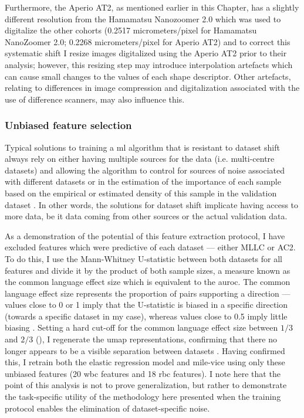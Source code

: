 Furthermore, the Aperio AT2, as mentioned earlier in this Chapter, has a slightly different resolution from the Hamamatsu Nanozoomer 2.0 which was used to digitalize the other cohorts (0.2517 micrometers/pixel for Hamamatsu NanoZoomer 2.0; 0.2268 micrometers/pixel for Aperio AT2) and to correct this systematic shift I resize images digitalized using the Aperio AT2 prior to their analysis; however, this resizing step may introduce interpolation artefacts which can cause small changes to the values of each shape descriptor. Other artefacts, relating to differences in image compression and digitalization associated with the use of difference scanners, may also influence this.

\subsubsection{Unbiased feature selection} 

Typical solutions to training a \ac{ml} algorithm that is resistant to dataset shift always rely on either having multiple sources for the data (i.e. multi-centre datasets) and allowing the algorithm to control for sources of noise associated with different datasets or in the estimation of the importance of each sample based on the empirical or estimated density of this sample in the validation dataset \cite{Y2019-vc}. In other words, the solutions for dataset shift implicate having access to more data, be it data coming from other sources or the actual validation data.

As a demonstration of the potential of this feature extraction protocol, I have excluded features which were predictive of each dataset --- either MLLC or AC2. To do this, I use the Mann-Whitney U-statistic between both datasets for all features and divide it by the product of both sample sizes, a measure known as the common language effect size which is equivalent to the \ac{auroc}. The common language effect size represents the proportion of pairs supporting a direction --- values close to 0 or 1 imply that the U-statistic is biased in a specific direction (towards a specific dataset in my case), whereas values close to 0.5 imply little biasing \cite{Kerby2014-fy}. Setting a hard cut-off for the common language effect size between $1/3$ and $2/3$ (), I regenerate the \ac{umap} representations, confirming that there no longer appears to be a visible separation between datasets . Having confirmed this, I retrain both the elastic regression model and \ac{mile-vice} using only these unbiased features (20 \ac{wbc} features and 18 \ac{rbc} features). I note here that the point of this analysis is not to prove generalization, but rather to demonstrate the task-specific utility of the methodology here presented when the training protocol enables the elimination of dataset-specific noise.


